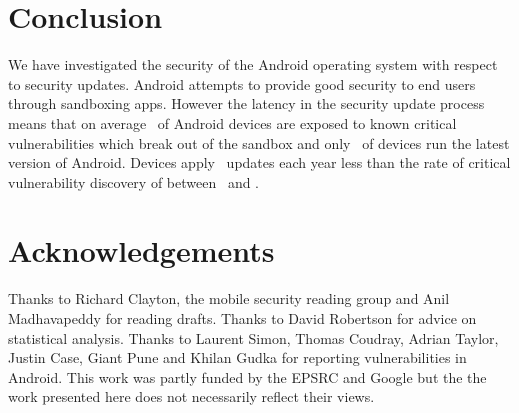 \documentclass{llncs}
\newcommand{\identifying}[1]{#1}%
\begin{document}
\section{Conclusion}
\label{sec:conclusion}
We have investigated the security of the Android operating system with respect to security updates.
Android attempts to provide good security to end users through sandboxing apps.
However the latency in the security update process means that on average \daMeanInsecurityPerc\ of Android devices are exposed to known critical vulnerabilities which break out of the sandbox and only \daUpdatednessPerc\ of devices run the latest version of Android.
Devices apply \daUpdatesPerYear\ updates each year less than the rate of critical vulnerability discovery of between \avoVulnsPerYearAllAndroid\ and \avoVulnsPerYear.

\identifying{
\section*{Acknowledgements}
Thanks to Richard Clayton, the mobile security reading group and Anil Madhavapeddy for reading drafts.
Thanks to David Robertson for advice on statistical analysis.
Thanks to Laurent Simon, Thomas Coudray, Adrian Taylor, Justin Case, Giant Pune and Khilan Gudka for reporting vulnerabilities in Android.
This work was partly funded by the EPSRC and Google but the the work presented here does not necessarily reflect their views.
}

\printbibliography
\end{document}
